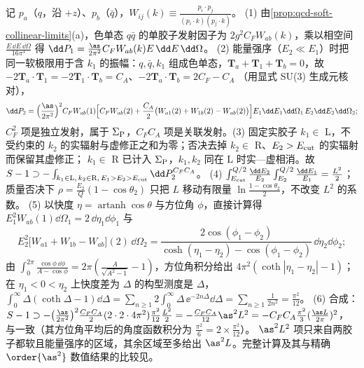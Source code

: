 \begin{proofsketch}
记 $p_a$（$q$，沿 $+z$）、$p_b$（$\bar q$），$W_{ij}(k)\equiv\frac{p_i\cdot p_j}{(p_i\cdot k)(p_j\cdot k)}$。
(1) 由\cref{prop:qcd-soft-collinear-limits}(a)，色单态 $q\bar q$ 的单胶子发射因子为 $2g^2C_FW_{ab}(k)$，乘以相空间 $\frac{E\,\dd E\,\dd\Omega}{16\pi^3}$ 得 $\dd P_1=\frac{\as}{2\pi^2}C_FW_{ab}(k)E\,\dd E\,\dd\Omega$。
(2) 能量强序（$E_2\ll E_1$）时把同一软极限用于含 $k_1$ 的振幅：$q,\bar q,k_1$ 组成色单态，$\bm T_a+\bm T_1+\bm T_b=0$，故 $-2\bm T_a\cdot\bm T_1=-2\bm T_1\cdot\bm T_b=C_A$、$-2\bm T_a\cdot\bm T_b=2C_F-C_A$
（用显式 SU(3) 生成元核对），
\[
\dd P_2=\Big(\frac{\as}{2\pi^2}\Big)^2C_FW_{ab}(1)\Big[C_FW_{ab}(2)+\frac{C_A}{2}\big(W_{a1}(2)+W_{1b}(2)-W_{ab}(2)\big)\Big]E_1\dd E_1\dd\Omega_1\,E_2\dd E_2\dd\Omega_2 ;
\]
$C_F^2$ 项是独立发射，属于 $\Sigma_{\rm P}$，$C_FC_A$ 项是关联发射。(3) 固定实胶子 $k_1\in$ L，不受约束的 $k_2$ 的实辐射与虚修正之和为零；否决去掉 $k_2\in$ R、$E_2>E_{\rm cut}$ 的实辐射而保留其虚修正；
$k_1\in$ R 已计入 $\Sigma_{\rm P}$，$k_1,k_2$ 同在 L 时实—虚相消。故 $S-1\supset-\int_{k_1\in{\rm L},\,k_2\in{\rm R},\,E_1>E_2>E_{\rm cut}}\dd P_2^{C_FC_A}$。
(4) $\int_{E_{\rm cut}}^{Q/2}\frac{\dd E_2}{E_2}\int_{E_2}^{Q/2}\frac{\dd E_1}{E_1}=\frac{L^2}{2}$；质量否决下 $\rho=\frac{E_2}{Q}(1-\cos\theta_2)$ 只把 $L$ 移动有限量 $\ln\frac{1-\cos\theta_2}{2}$，不改变 $L^2$ 的系数。
(5) 以快度 $\eta=\operatorname{artanh}\cos\theta$ 与方位角 $\phi$，直接计算得 $E_1^2W_{ab}(1)\dd\Omega_1=2\,\dd\eta_1\dd\phi_1$ 与
\[
E_2^2\big[W_{a1}+W_{1b}-W_{ab}\big](2)\,\dd\Omega_2=\frac{2\cos(\phi_1-\phi_2)}{\cosh(\eta_1-\eta_2)-\cos(\phi_1-\phi_2)}\,\dd\eta_2\dd\phi_2 ;
\]
由 $\int_0^{2\pi}\frac{\cos\phi\,\dd\phi}{A-\cos\phi}=2\pi(\frac{A}{\sqrt{A^2-1}}-1)$，方位角积分给出 $4\pi^2(\coth|\eta_1-\eta_2|-1)$；在 $\eta_1<0<\eta_2$ 上快度差为 $\Delta$ 的构型测度是 $\Delta$，
$\int_0^\infty\Delta(\coth\Delta-1)\dd\Delta=\sum_{n\ge1}2\int_0^\infty\Delta\,\ee^{-2n\Delta}\dd\Delta=\sum_{n\ge1}\frac{1}{2n^2}=\frac{\pi^2}{12}$。
(6) 合成：$S-1\supset-\big(\frac{\as}{2\pi^2}\big)^2\frac{C_FC_A}{2}(2\cdot2\cdot4\pi^2)\frac{\pi^2}{12}\frac{L^2}{2}=-\frac{C_FC_A}{12}\as^2L^2=-C_FC_A\frac{\pi^2}{3}(\frac{\as L}{2\pi})^2$，
与\cite[式~(11)]{DasguptaSalam2001}一致（其方位角平均后的角度函数积分为 $\frac{\pi^2}{6}=2\times\frac{\pi^2}{12}$）。
$\as^2L^2$ 项只来自两胶子都软且能量强序的区域，其余区域至多给出 $\as^2L$。完整计算及其与精确 $\order{\as^2}$ 数值结果的比较见\cite[第~2、4~节]{DasguptaSalam2001}。
\end{proofsketch}

